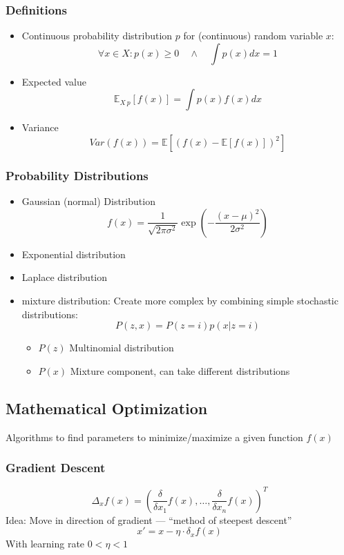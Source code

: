 \subsubsection{Definitions}%
\label{ml:ssub:definitions}
\begin{itemize}
\item Continuous probability distribution \(p\) for (continuous) random variable \(x\):\\
  \[\forall x \in X: p(x) \geq 0 \quad \land \quad \int p(x) dx = 1\]
\item Expected value
  \[ \mathbb{E}_{X~p}[f(x)] = \int p(x)f(x)dx\]
\item Variance
  \[\mathit{Var}(f(x)) = \mathbb{E}[{(f(x) - \mathbb{E}[f(x)])}^2]\]
\end{itemize}

\subsubsection{Probability Distributions}%
\label{ml:ssub:probability_distributions}
\begin{itemize}
\item Gaussian (normal) Distribution
  \[f(x) = \frac{1}{\sqrt{2\pi \sigma^2}} \exp (-\frac{(x - \mu)^2}{2 \sigma^2})\]
\item Exponential distribution
\item Laplace distribution
\item mixture distribution: Create more complex by combining simple stochastic distributions:
  \[P(z, x) = P(z = i)p(x|z = i)\]
  \begin{itemize}
  \item \(P(z)\) Multinomial distribution
  \item \(P(x)\) Mixture component, can take different distributions
  \end{itemize}
\end{itemize}

\subsection{Mathematical Optimization}%
\label{ml:sub:mathematical_optimization}
Algorithms to find parameters to minimize/maximize a given function \(f(x)\)

\subsubsection{Gradient Descent}%
\label{ml:ssub:gradient_descent}
\[\Delta_x f(x) = {(\frac{\delta}{\delta x_1} f(x), \ldots, \frac{\delta}{\delta x_n} f(x))}^T\]
Idea: Move in direction of gradient --- \enquote{method of steepest descent}
\[x' = x - \eta \cdot \delta_x f(x)\]
With learning rate \(0 < \eta < 1\)


